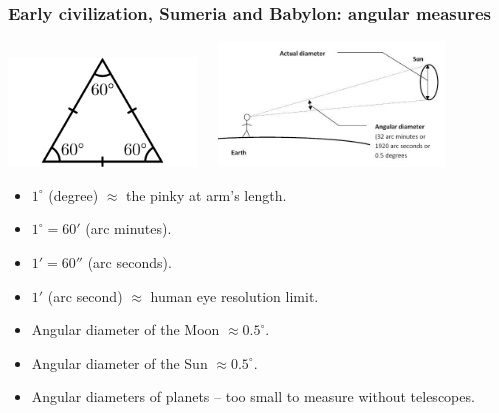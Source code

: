 \documentclass[aspectratio=169,xcolor=pdftex,dvipsnames]{beamer} %
\begin{document}
\begin{frame}
\frametitle{Early civilization, Sumeria and Babylon: angular measures}

\hspace{-1cm}
\includegraphics[width=50mm]{equilateralTriangle.pdf}\  \ \  
\includegraphics[width=60mm]{angularDiameter.jpg}

\begin{itemize}
\item
$1^\circ$ (degree) $\approx$ the pinky at arm's length. 
\item
$1^\circ=60'$ (arc minutes).
\item
$1'=60''$ (arc seconds).
\item
$1'$ (arc second) $\approx$ human eye resolution limit.
\item
Angular diameter of the Moon $\approx 0.5^\circ$.
\item
Angular diameter of the Sun $\approx 0.5^\circ$.
\item
Angular diameters of planets -- too small to measure without telescopes.
\end{itemize}

\end{frame}
\end{document}
